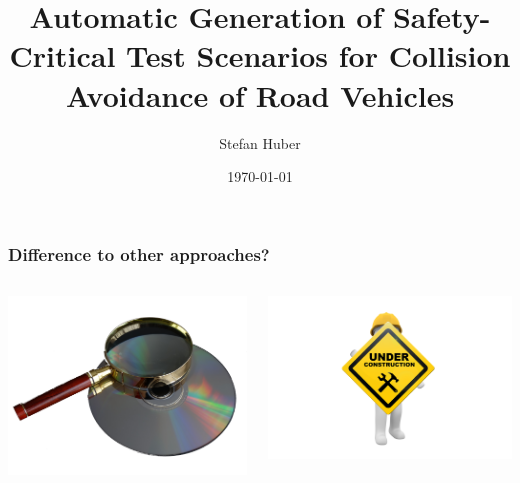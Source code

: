 \documentclass{beamer}
\title{Automatic Generation of Safety-Critical Test Scenarios for Collision Avoidance of Road Vehicles}
\author{Stefan Huber}
\date{\today}
\begin{document}
\maketitle

\begin{frame}
    \frametitle{Difference to other approaches?}
    \pause{}
    \begin{columns}
        \begin{column}{0.5\textwidth}
            \includegraphics[width=\textwidth]{search.png}
            \pause{}
        \end{column}
        \begin{column}{0.5\textwidth}
            \includegraphics[width=\textwidth]{construction.png}
        \end{column}
    \end{columns}
\end{frame}
\end{document}
